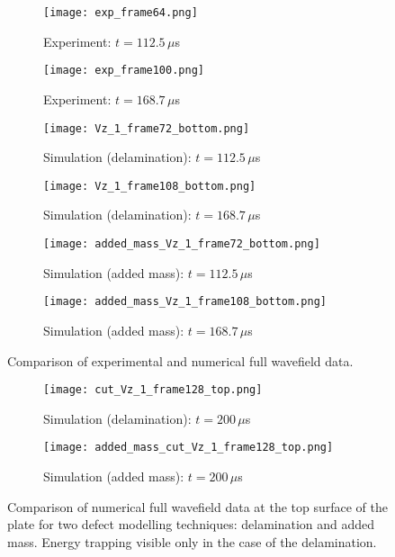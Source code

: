 \documentclass[preprint,12pt]{elsarticle}
\begin{document}
	\begin{figure} [h!]
		\begin{subfigure}[b]{0.49\textwidth}
			\centering
			\texttt{[image: exp\_frame64.png]}
			\caption{Experiment: $t=112.5\,  \mu$s}
			\label{fig:exp_frame64}
		\end{subfigure}
		\begin{subfigure}[b]{0.49\textwidth}
			\centering
			\texttt{[image: exp\_frame100.png]}
			\caption{Experiment: $t=168.7\, \mu$s}
			\label{fig:exp_frame100.png}
		\end{subfigure}
		\hfill
		\begin{subfigure}[b]{0.49\textwidth}
			\centering
			\texttt{[image: Vz\_1\_frame72\_bottom.png]} 
			\caption{Simulation (delamination): $t=112.5\,  \mu$s}
			\label{fig:num_frame72}
		\end{subfigure}
		\hfill
		\begin{subfigure}[b]{0.49\textwidth}
			\centering
			\texttt{[image: Vz\_1\_frame108\_bottom.png]}
			\caption{Simulation (delamination): $t=168.7\, \mu$s}
			\label{fig:num_frame108}
		\end{subfigure}
		\hfill
		\begin{subfigure}[b]{0.49\textwidth}
			\centering
			\texttt{[image: added\_mass\_Vz\_1\_frame72\_bottom.png]} 
			\caption{Simulation (added mass): $t=112.5\,  \mu$s}
			\label{fig:num_frame72_added_mass}
		\end{subfigure}
		\hfill
		\begin{subfigure}[b]{0.49\textwidth}
			\centering
			\texttt{[image: added\_mass\_Vz\_1\_frame108\_bottom.png]}
			\caption{Simulation (added mass): $t=168.7\, \mu$s}
			\label{fig:num_frame108_added_mass}
		\end{subfigure}
		\caption{Comparison of experimental and numerical full wavefield data.} 
		\label{fig:wavefields_comparison}
	\end{figure}
	
	\begin{figure} [h!]
		\begin{subfigure}[b]{0.49\textwidth}
			\centering
			\texttt{[image: cut\_Vz\_1\_frame128\_top.png]} 
			\caption{Simulation (delamination): $t=200\,  \mu$s}
			\label{fig:num_frame128_top}
		\end{subfigure}
		\hfill
		\begin{subfigure}[b]{0.49\textwidth}
			\centering
			\texttt{[image: added\_mass\_cut\_Vz\_1\_frame128\_top.png]}
			\caption{Simulation (added mass): $t=200\, \mu$s}
			\label{fig:num_frame128_added_mass_top}
		\end{subfigure}
		\caption{Comparison of numerical full wavefield data at the top surface of the plate for two defect modelling techniques: delamination and added mass. Energy trapping visible only in the case of the delamination.} 
		\label{fig:wave_entrapment}
	\end{figure}
	\clearpage
	
\end{document}
